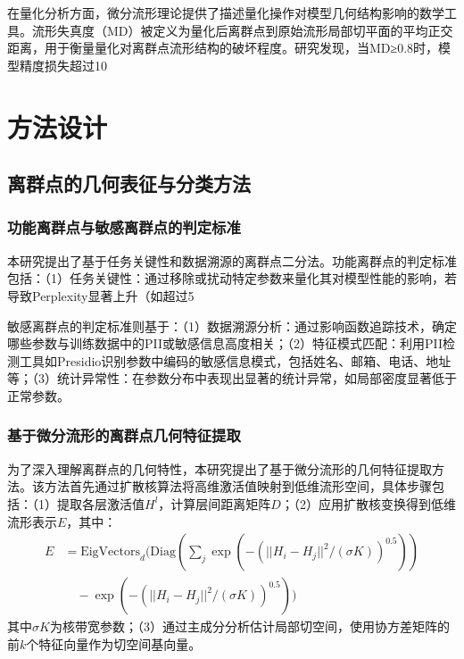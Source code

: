 在量化分析方面，微分流形理论提供了描述量化操作对模型几何结构影响的数学工具。流形失真度（MD）被定义为量化后离群点到原始流形局部切平面的平均正交距离，用于衡量量化对离群点流形结构的破坏程度。研究发现，当MD≥0.8时，模型精度损失超过10%

\section{方法设计}

\subsection{离群点的几何表征与分类方法}

\subsubsection{功能离群点与敏感离群点的判定标准}

本研究提出了基于任务关键性和数据溯源的离群点二分法。功能离群点的判定标准包括：（1）任务关键性：通过移除或扰动特定参数来量化其对模型性能的影响，若导致Perplexity显著上升（如超过5%

敏感离群点的判定标准则基于：（1）数据溯源分析：通过影响函数追踪技术，确定哪些参数与训练数据中的PII或敏感信息高度相关；（2）特征模式匹配：利用PII检测工具如Presidio识别参数中编码的敏感信息模式，包括姓名、邮箱、电话、地址等；（3）统计异常性：在参数分布中表现出显著的统计异常，如局部密度显著低于正常参数。

\subsubsection{基于微分流形的离群点几何特征提取}

为了深入理解离群点的几何特性，本研究提出了基于微分流形的几何特征提取方法。该方法首先通过扩散核算法将高维激活值映射到低维流形空间，具体步骤包括：（1）提取各层激活值$H^l$，计算层间距离矩阵$D$；（2）应用扩散核变换得到低维流形表示$E$，其中：
\begin{align}
E &= \text{EigVectors}_d(\text{Diag}(\sum_j \exp(-(||H_i-H_j||^2/(\sigma K))^{0.5})) \nonumber \\
&\quad - \exp(-(||H_i-H_j||^2/(\sigma K))^{0.5}))
\end{align}
其中$\sigma K$为核带宽参数；（3）通过主成分分析估计局部切空间，使用协方差矩阵的前$k$个特征向量作为切空间基向量。

